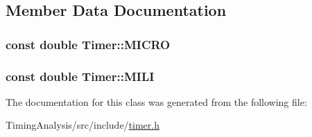 \subsection{Member Data Documentation}
\hypertarget{classTimer_a34f60ca96ff5a7f7e1f9c808642c102d}{
\subsubsection[{M\-I\-C\-R\-O}]{\setlength{\rightskip}{0pt plus 5cm}const double Timer\-::\-M\-I\-C\-R\-O\hspace{0.3cm}{\ttfamily [static]}}}\label{classTimer_a34f60ca96ff5a7f7e1f9c808642c102d}
\hypertarget{classTimer_a6dc3788aafa58a3b9449a5ca37c780bf}{
\subsubsection[{M\-I\-L\-I}]{\setlength{\rightskip}{0pt plus 5cm}const double Timer\-::\-M\-I\-L\-I\hspace{0.3cm}{\ttfamily [static]}}}\label{classTimer_a6dc3788aafa58a3b9449a5ca37c780bf}


The documentation for this class was generated from the following file\-:\begin{DoxyCompactItemize}
\item 
Timing\-Analysis/src/include/\hyperlink{timer_8h}{timer.\-h}\end{DoxyCompactItemize}
